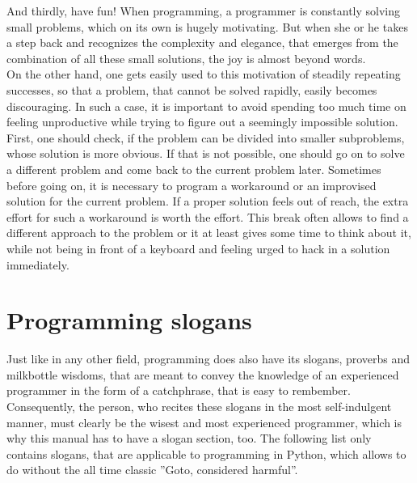 		And thirdly, have fun!
		When programming, a programmer is constantly solving small problems, which on its own is hugely motivating.
		But when she or he takes a step back and recognizes the complexity and elegance, that emerges from the combination of all these small solutions, the joy is almost beyond words.\\
		On the other hand, one gets easily used to this motivation of steadily repeating successes, so that a problem, that cannot be solved rapidly, easily becomes discouraging.
		In such a case, it is important to avoid spending too much time on feeling unproductive while trying to figure out a seemingly impossible solution.
		First, one should check, if the problem can be divided into smaller subproblems, whose solution is more obvious.
		If that is not possible, one should go on to solve a different problem and come back to the current problem later.
		Sometimes before going on, it is necessary to program a workaround or an improvised solution for the current problem.
		If a proper solution feels out of reach, the extra effort for such a workaround is worth the effort.
		This break often allows to find a different approach to the problem or it at least gives some time to think about it, while not being in front of a keyboard and feeling urged to hack in a solution immediately.


	\section{Programming slogans}
		Just like in any other field, programming does also have its slogans, proverbs and milkbottle wisdoms, that are meant to convey the knowledge of an experienced programmer in the form of a catchphrase, that is easy to rembember.
		Consequently, the person, who recites these slogans in the most self-indulgent manner, must clearly be the wisest and most experienced programmer, which is why this manual has to have a slogan section, too.
		The following list only contains slogans, that are applicable to programming in Python, which allows to do without the all time classic ''Goto, considered harmful''.

